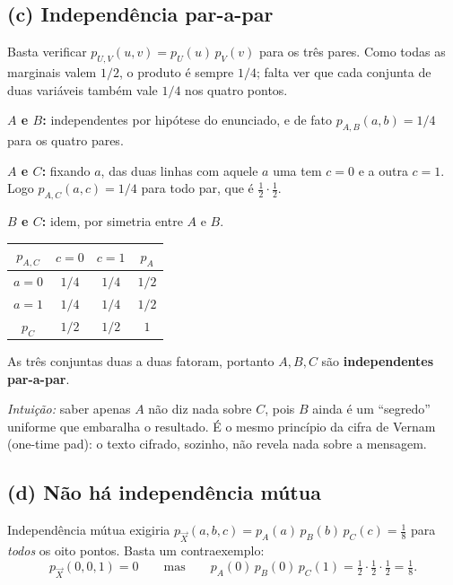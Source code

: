 \documentclass[11pt,a4paper]{article}
\begin{document}
\subsection*{(c) Independência par-a-par}

Basta verificar $p_{U,V}(u,v)=p_U(u)\,p_V(v)$ para os três pares. Como todas as
marginais valem $1/2$, o produto é sempre $1/4$; falta ver que cada conjunta de
duas variáveis também vale $1/4$ nos quatro pontos.

\noindent\textbf{$A$ e $B$:} independentes por hipótese do enunciado, e de fato
$p_{A,B}(a,b)=1/4$ para os quatro pares.

\noindent\textbf{$A$ e $C$:} fixando $a$, das duas linhas com aquele $a$ uma tem
$c=0$ e a outra $c=1$. Logo $p_{A,C}(a,c)=1/4$ para todo par, que é
$\tfrac12\cdot\tfrac12$. \checkmark

\noindent\textbf{$B$ e $C$:} idem, por simetria entre $A$ e $B$. \checkmark

\begin{center}
\begin{tabular}{c|cc|c}
\toprule
$p_{A,C}$ & $c=0$ & $c=1$ & $p_A$ \\
\midrule
$a=0$ & $1/4$ & $1/4$ & $1/2$ \\
$a=1$ & $1/4$ & $1/4$ & $1/2$ \\
\midrule
$p_C$ & $1/2$ & $1/2$ & $1$ \\
\bottomrule
\end{tabular}
\end{center}

\begin{resp}
As três conjuntas duas a duas fatoram, portanto $A,B,C$ são
\textbf{independentes par-a-par}.
\end{resp}

\emph{Intuição:} saber apenas $A$ não diz nada sobre $C$, pois $B$ ainda é um
``segredo'' uniforme que embaralha o resultado. É o mesmo princípio da cifra de
Vernam (one-time pad): o texto cifrado, sozinho, não revela nada sobre a mensagem.

\subsection*{(d) Não há independência mútua}

Independência mútua exigiria
$p_{\vec X}(a,b,c)=p_A(a)\,p_B(b)\,p_C(c)=\tfrac18$ para \emph{todos} os oito
pontos. Basta um contraexemplo:
\[
p_{\vec X}(0,0,1)=0
\qquad\text{mas}\qquad
p_A(0)\,p_B(0)\,p_C(1)=\tfrac12\cdot\tfrac12\cdot\tfrac12=\tfrac18 .
\]
\end{document}

